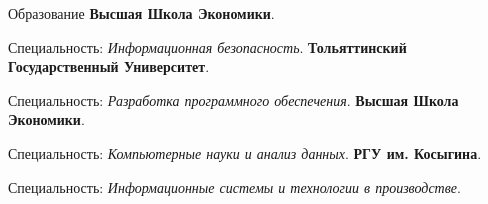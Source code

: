 \begin{rubric}{Образование}
\entry*[2021 -- 2022]%
    \textbf{Высшая Школа Экономики}.
    \par Специальность: \emph{Информационная безопасность}.
%
\entry*[2022 -- 2023]%
    \textbf{Тольяттинский Государственный Университет}.
    \par Специальность: \emph{Разработка программного обеспечения}.
%
\entry*[2023 -- 2027]%
    \textbf{Высшая Школа Экономики}.
    \par Специальность: \emph{Компьютерные науки и анализ данных}.
%
\entry*[2023 -- 2026]%
    \textbf{РГУ им. Косыгина}.
    \par Специальность: \emph{Информационные системы и технологии в производстве}.
\end{rubric}
